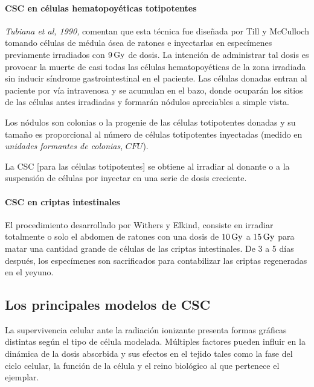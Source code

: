 \documentclass[12pt,letterpaper, oneside]{book}
\begin{document}
				\paragraph{CSC en células hematopoyéticas totipotentes \newline}
				\textit{Tubiana et al, 1990,} comentan que esta técnica fue diseñada por Till y McCulloch tomando células de médula ósea de ratones e inyectarlas en especímenes previamente irradiados con $\unit[9]{Gy}$ de dosis. La intención de administrar tal dosis es provocar la muerte de casi todas las células hematopoyéticas de la zona irradiada sin inducir síndrome gastrointestinal en el paciente. Las células donadas entran al paciente por vía intravenosa y se acumulan en el bazo, donde ocuparán los sitios de las células antes irradiadas y formarán nódulos apreciables a simple vista. 
				
				Los nódulos son colonias o la progenie de las células totipotentes donadas y su tamaño es proporcional al número de células totipotentes inyectadas (medido en \textit{unidades formantes de colonias}, $CFU$). 
				
				La CSC [para las células totipotentes] se obtiene al irradiar al donante o a la suspensión de células por inyectar en una serie de dosis creciente. 
				
				\paragraph{CSC en criptas intestinales \newline}
				El procedimiento desarrollado por Withers y Elkind, consiste en irradiar totalmente o solo el abdomen de ratones con una dosis de $\unit[10]{Gy}$ a $\unit[15]{Gy}$ para matar una cantidad grande de células de las criptas intestinales. De 3 a 5 días después, los especímenes son sacrificados para contabilizar las criptas regeneradas en el yeyuno\cite{Tubiana.1990}. 
			
			\subsection{Los principales modelos de CSC}
			La supervivencia celular ante la radiación ionizante presenta formas gráficas distintas según el tipo de célula modelada\cite{Tubiana.1990}. Múltiples factores pueden influir en la dinámica de la dosis absorbida y sus efectos en el tejido tales como la fase del ciclo celular, la función de la célula y el reino biológico al que pertenece el ejemplar\cite{Tubiana.1990}.
			
\end{document}

